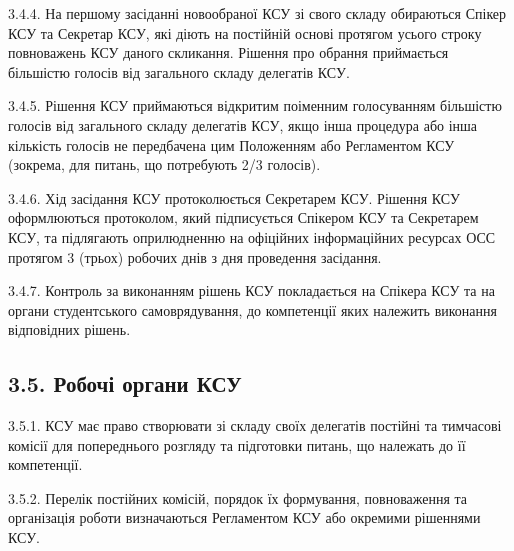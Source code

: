     3.4.4. На першому засіданні новообраної КСУ зі свого складу обираються Спікер КСУ та Секретар КСУ, які діють на постійній основі протягом усього строку повноважень КСУ даного скликання. Рішення про обрання приймається більшістю голосів від загального складу делегатів КСУ.

    3.4.5. Рішення КСУ приймаються відкритим поіменним голосуванням більшістю голосів від загального складу делегатів КСУ, якщо інша процедура або інша кількість голосів не передбачена цим Положенням або Регламентом КСУ (зокрема, для питань, що потребують 2/3 голосів).

    3.4.6. Хід засідання КСУ протоколюється Секретарем КСУ. Рішення КСУ оформлюються протоколом, який підписується Спікером КСУ та Секретарем КСУ, та підлягають оприлюдненню на офіційних інформаційних ресурсах ОСС протягом 3 (трьох) робочих днів з дня проведення засідання.

    3.4.7. Контроль за виконанням рішень КСУ покладається на Спікера КСУ та на органи студентського самоврядування, до компетенції яких належить виконання відповідних рішень.

\subsection*{3.5. Робочі органи КСУ}
    3.5.1. КСУ має право створювати зі складу своїх делегатів постійні та тимчасові комісії для попереднього розгляду та підготовки питань, що належать до її компетенції.

    3.5.2. Перелік постійних комісій, порядок їх формування, повноваження та організація роботи визначаються Регламентом КСУ або окремими рішеннями КСУ.